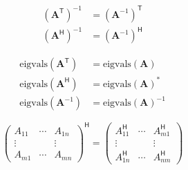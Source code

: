 \noindent\begin{align*}
    {(\mathbf{A}^\mathsf{T})}^{-1} & = {(\mathbf{A}^{-1})}^\mathsf{T} \\
    {(\mathbf{A}^\mathsf{H})}^{-1} & = {(\mathbf{A}^{-1})}^\mathsf{H}
\end{align*}

\noindent\begin{align*}
    \mathrm{eigvals}(\mathbf{A}^\mathsf{T}) & = \mathrm{eigvals}(\mathbf{A})        \\
    \mathrm{eigvals}(\mathbf{A}^\mathsf{H}) & = \mathrm{eigvals}{(\mathbf{A})}^*    \\
    \mathrm{eigvals}(\mathbf{A}^{-1})       & = \mathrm{eigvals}{(\mathbf{A})}^{-1}
\end{align*}

\noindent\begin{equation*}
    \begin{pmatrix}
        A_{11} & \cdots & A_{1n} \\
        \vdots &        & \vdots \\
        A_{m1} & \cdots & A_{mn}
    \end{pmatrix}^\mathsf{H}=
    \begin{pmatrix}
        A_{11}^\mathsf{H} & \cdots & A_{m1}^\mathsf{H} \\
        \vdots            &        & \vdots            \\
        A_{1n}^\mathsf{H} & \cdots & A_{nm}^\mathsf{H}
    \end{pmatrix}
\end{equation*}